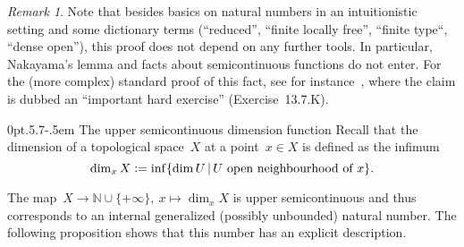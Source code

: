 \documentclass[10pt,reqno,a4paper]{amsbook}
\makeatletter
\theoremstyle{definition}
\theoremstyle{plain}
\theoremstyle{remark}
\newtheorem{rem}[defn]{Remark}
\newcommand{\NN}{\mathbb{N}}
\newcommand{\?}{\,{:}\,}
\renewcommand{\_}{\mathpunct{.}\,}
\newcommand{\defeq}{\vcentcolon=}
\def\subsection{\@startsection{subsection}{2}%
  {0pt}{.5\linespacing\@plus.7\linespacing}{-.5em}%
  {\normalfont\bfseries}}
\makeatother
\begin{document}
\begin{rem}Note that besides basics on natural numbers in an intuitionistic
setting and some dictionary terms (``reduced'', ``finite locally free'',
``finite type``, ``dense open''), this proof does not depend on any further
tools. In particular, Nakayama's lemma and facts about semicontinuous functions
do not enter. For the (more complex) standard proof of this fact, see for
instance~\cite{vakil:foag}, where the claim is dubbed an ``important hard
exercise'' (Exercise~13.7.K).\end{rem}


\subsection{The upper semicontinuous dimension function} Recall that the
dimension of a topological space~$X$ at a point~$x \in X$ is defined as the
infimum
\[ \dim_x X \defeq \inf\{ \dim U \,|\, \text{$U$ open neighbourhood of~$x$} \}. \]

The map~$X \to \NN \cup \{+\infty\},\ x \mapsto \dim_x X$ is upper
semicontinuous and thus corresponds to an internal generalized (possibly
unbounded) natural number. The following proposition shows that this number has
an explicit description.
\end{document}
